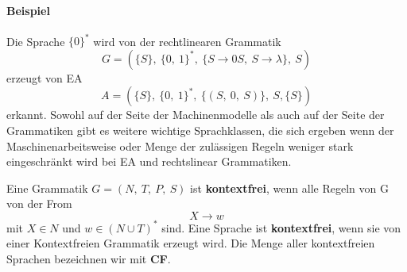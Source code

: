 \paragraph*{Beispiel}
    Die Sprache \(\{0\}^*\) wird von der rechtlinearen Grammatik \[ G = (\{S\},\ \{0,\ 1\}^*,\ \{S \to 0S,\ S \to \lambda\},\ S)\] erzeugt von EA \[A = (\{S\},\ \{0,\ 1\}^*,\ \{(S,\ 0,\ S)\},\ S, \{S\})\] erkannt. Sowohl auf der Seite der Machinenmodelle als auch auf der Seite der Grammatiken gibt es weitere wichtige Sprachklassen, die sich ergeben wenn der Maschinenarbeitsweise oder Menge der zulässigen Regeln weniger stark eingeschränkt wird bei EA und rechtslinear Grammatiken.

    Eine Grammatik \(G = (N,\ T,\ P,\ S)\) ist \textbf{kontextfrei}, wenn alle Regeln von G von der From \[X \to w\] mit \(X \in N\) und \(w \in (N \cup T)^*\) sind. Eine Sprache ist \textbf{kontextfrei}, wenn sie von einer Kontextfreien Grammatik erzeugt wird. Die Menge aller kontextfreien Sprachen bezeichnen wir mit \textbf{CF}.

